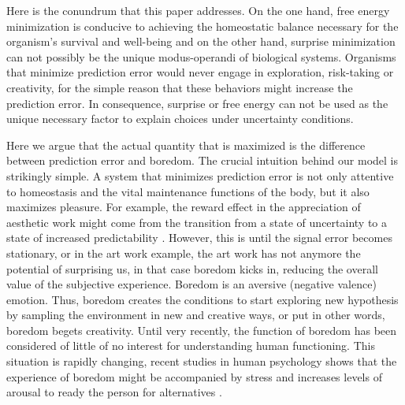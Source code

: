 \documentclass[11pt, onecolumn]{article}
\begin{document}
Here is the conundrum that this paper addresses. On the one hand, free energy minimization is conducive to achieving the homeostatic balance necessary for the organism's survival and well-being and on the other hand, surprise minimization can not possibly be the unique modus-operandi of biological systems. Organisms that minimize prediction error would never engage in exploration, risk-taking or creativity, for the simple reason that these behaviors might increase the prediction error. 
In consequence, surprise or free energy can not be used as the unique necessary factor to explain choices under uncertainty conditions. 

Here we argue that the actual quantity that is maximized is the difference between prediction error and boredom. 
The crucial intuition behind our model is strikingly simple.
A system that minimizes prediction error is not only attentive to homeostasis and the vital maintenance functions of the body, but it also maximizes pleasure. For example, the reward effect in the appreciation of aesthetic work might come from the transition from a state of uncertainty to a state of increased predictability \citep{van_de_cruys_putting_2011}.
However, this is until the signal error becomes stationary, or in the art work example, the art work has not anymore the potential of surprising us, in that case boredom kicks in, reducing the overall value of the subjective experience.
Boredom is an aversive (negative valence) emotion. Thus, boredom creates the conditions to start exploring new hypothesis by sampling the environment in new and creative ways, or put in other words, boredom begets creativity. 
Until very recently, the function of boredom has been considered of little of no interest for understanding human functioning. This situation is rapidly changing, 
recent studies in human psychology shows that the experience of boredom might be accompanied by stress and increases levels of arousal to ready the person for alternatives \citep{posner_neurophysiological_2009} \citep{bench_function_2013}. 

\end{document}
